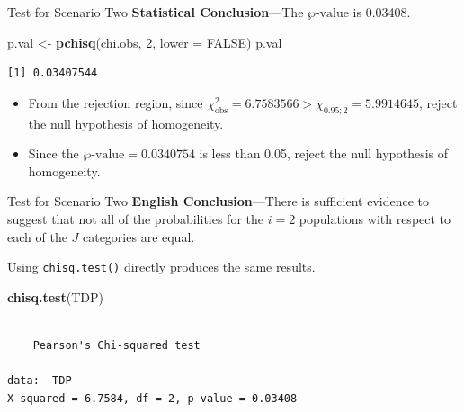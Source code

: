 \documentclass[
  ignorenonframetext,
]{beamer}
\newenvironment{Shaded}{\begin{snugshade}}{\end{snugshade}}
\newcommand{\AttributeTok}[1]{\textcolor[rgb]{0.13,0.29,0.53}{#1}}
\newcommand{\ConstantTok}[1]{\textcolor[rgb]{0.56,0.35,0.01}{#1}}
\newcommand{\DecValTok}[1]{\textcolor[rgb]{0.00,0.00,0.81}{#1}}
\newcommand{\FunctionTok}[1]{\textcolor[rgb]{0.13,0.29,0.53}{\textbf{#1}}}
\newcommand{\NormalTok}[1]{#1}
\newcommand{\OtherTok}[1]{\textcolor[rgb]{0.56,0.35,0.01}{#1}}
\begin{document}
\begin{frame}[fragile]{Test for Scenario Two}
\protect\hypertarget{test-for-scenario-two-4}{}
\textbf{Statistical Conclusion}---The \(\wp\text{-value}\) is 0.03408.

\begin{Shaded}
\begin{Highlighting}[]
\NormalTok{p.val }\OtherTok{\textless{}{-}} \FunctionTok{pchisq}\NormalTok{(chi.obs, }\DecValTok{2}\NormalTok{, }\AttributeTok{lower =} \ConstantTok{FALSE}\NormalTok{)}
\NormalTok{p.val}
\end{Highlighting}
\end{Shaded}

\begin{verbatim}
[1] 0.03407544
\end{verbatim}

\begin{itemize}
\item
  From the rejection region, since
  \(\chi_{\text{obs}}^2=6.7583566 > \chi_{0.95;2} = 5.9914645\), reject
  the null hypothesis of homogeneity.
\item
  Since the \(\wp\text{-value}= 0.0340754\) is less than 0.05, reject
  the null hypothesis of homogeneity.
\end{itemize}
\end{frame}

\begin{frame}[fragile]{Test for Scenario Two}
\protect\hypertarget{test-for-scenario-two-5}{}
\textbf{English Conclusion}---There is sufficient evidence to suggest
that not all of the probabilities for the \(i=2\) populations with
respect to each of the \(J\) categories are equal.

Using \texttt{chisq.test()} directly produces the same results.

\begin{Shaded}
\begin{Highlighting}[]
\FunctionTok{chisq.test}\NormalTok{(TDP)}
\end{Highlighting}
\end{Shaded}

\begin{verbatim}

    Pearson's Chi-squared test

data:  TDP
X-squared = 6.7584, df = 2, p-value = 0.03408
\end{verbatim}
\end{frame}
\end{document}
